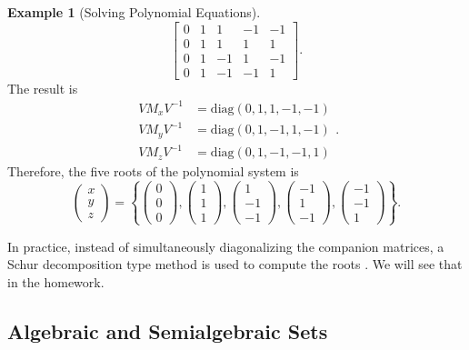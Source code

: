 \documentclass[
]{book}
\theoremstyle{definition}
\theoremstyle{definition}
\newtheorem{example}{Example}[chapter]
\theoremstyle{definition}
\theoremstyle{definition}
\theoremstyle{remark}
\begin{document}
\begin{example}[Solving Polynomial Equations]
\[\begin{bmatrix}
0 & 1 & 1 & -1 & -1\\
0 & 1 & 1 & 1 & 1\\
0 & 1 & -1 & 1 & -1 \\
0 & 1 & -1 & -1 & 1
\end{bmatrix}.
\]
The result is
\begin{equation}
\begin{split}
V M_x V^{-1}&= \mathrm{diag}(0 , 1, 1, -1, -1)\\
V M_y V^{-1}&= \mathrm{diag}(0 , 1, -1, 1, -1)\\
V M_z V^{-1}&= \mathrm{diag}(0 , 1, -1, -1, 1)
\end{split}.
\end{equation}
Therefore, the five roots of the polynomial system is
\[
\begin{pmatrix}
x \\ y \\ z 
\end{pmatrix} =
 \left\{ 
    \begin{pmatrix} 0 \\ 0 \\ 0 \end{pmatrix},
    \begin{pmatrix} 1 \\ 1 \\ 1 \end{pmatrix},
    \begin{pmatrix} 1 \\ -1 \\ -1 \end{pmatrix},
    \begin{pmatrix} -1 \\ 1 \\ -1 \end{pmatrix},
    \begin{pmatrix} -1 \\ -1 \\ 1 \end{pmatrix}
 \right\} .
\]
\end{example}

In practice, instead of simultaneously diagonalizing the companion matrices, a Schur decomposition type method is used to compute the roots \citep{corless97-reordered}. We will see that in the homework.

\subsection{Algebraic and Semialgebraic Sets}\label{algebraic-and-semialgebraic-sets}
\end{document}
